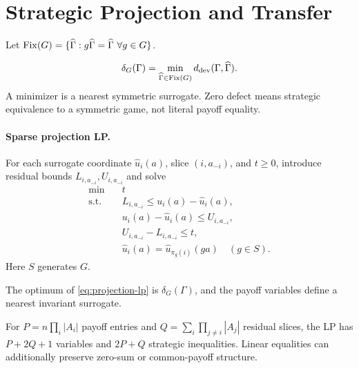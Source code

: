 \section{Strategic Projection and Transfer}

Let $\Fix(G)=\{\widehat\Gamma:g\widehat\Gamma=\widehat\Gamma\ \forall g\in G\}$.
\begin{definition}
\label{def:defect}
\begin{equation}
\delta_G(\Gamma)
=
\min_{\widehat\Gamma\in\operatorname{Fix}(G)}
d_{\mathrm{dev}}(\Gamma,\widehat\Gamma).
\label{eq:defect}
\end{equation}
A minimizer is a nearest symmetric surrogate.  Zero defect means strategic equivalence to a symmetric game, not literal payoff equality.
\end{definition}

\paragraph{Sparse projection LP.}
For each surrogate coordinate $\widehat u_i(a)$, slice $(i,a_{-i})$, and $t\ge0$, introduce residual bounds $L_{i,a_{-i}},U_{i,a_{-i}}$ and solve
\begin{align}
\min\quad &t \label{eq:projection-lp}\\
\text{s.t.}\quad
&L_{i,a_{-i}}
\le u_i(a)-\widehat u_i(a),\nonumber\\
&u_i(a)-\widehat u_i(a)
\le U_{i,a_{-i}},\nonumber\\
&U_{i,a_{-i}}-L_{i,a_{-i}}\le t,\nonumber\\
&\widehat u_i(a)=\widehat u_{\pi_g(i)}(ga)
\quad(g\in S).\nonumber
\end{align}
Here $S$ generates $G$.
\begin{theorem}
\label{thm:lp}
The optimum of \eqref{eq:projection-lp} is $\delta_G(\Gamma)$, and the payoff variables define a nearest invariant surrogate.
\end{theorem}
For $P=n\prod_i|A_i|$ payoff entries and
$Q=\sum_i\prod_{j\ne i}|A_j|$ residual slices, the LP has $P+2Q+1$ variables and $2P+Q$ strategic inequalities.  Linear equalities can additionally preserve zero-sum or common-payoff structure.

